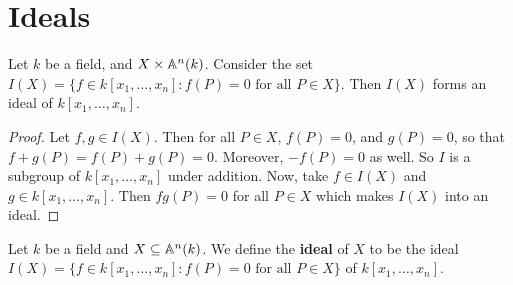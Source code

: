 \section{Ideals}

\begin{lemma}\label{1.3.1}
    Let $k$ be a field, and  $X \times \mathbb{A}^n(k)$. Consider the set $I(X)=\{f \in
    k[x_1, \dots, x_n] : f(P)=0 \text{ for all } P \in X\}$. Then $I(X)$ forms
    an ideal of $k[x_1, \dots, x_n]$.
\end{lemma}
\begin{proof}
    Let $f,g \in I(X)$. Then for all $P \in X$,  $f(P)=0$, and $g(P)=0$, so that
    $f+g(P)=f(P)+g(P)=0$. Moreover, $-f(P)=0$ as well. So $I$ is a subgroup of
    $k[x_1, \dots, x_n]$ under addition. Now, take $f \in I(X)$ and $g \in
    k[x_1, \dots, x_n]$. Then $fg(P)=0$ for all $P \in X$ which makes  $I(X)$
    into an ideal.
\end{proof}

\begin{definition}
    Let $k$ be a field and  $X \subseteq \mathbb{A}^n(k)$. We define the \textbf{ideal}
    of $X$ to be the ideal $I(X)=\{f \in k[x_1, \dots, x_n] : f(P)=0 \text{ for
    all } P \in X\}$ of $k[x_1, \dots, x_n]$.
\end{definition}

